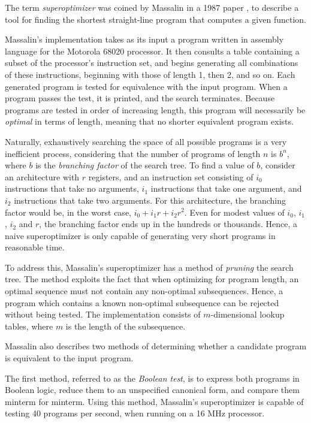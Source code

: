 \documentclass[a4paper,11pt]{kth-mag}
\begin{document}
The term \emph{superoptimizer} was coined by Massalin in a 1987 paper \cite{massalin87}, to describe a tool for finding the shortest straight-line program that computes a given function. %

Massalin's implementation takes as its input a program written in assembly language for the Motorola 68020 processor.
It then consults a table containing a subset of the processor's instruction set, and begins generating all combinations of these instructions, beginning with those of length 1, then 2, and so on.
Each generated program is tested for equivalence with the input program.
When a program passes the test, it is printed, and the search terminates.
Because programs are tested in order of increasing length, this program will necessarily be \emph{optimal} in terms of length, meaning that no shorter equivalent program exists.

Naturally, exhaustively searching the space of all possible programs is a very inefficient process, considering that the number of programs of length $n$ is $b^n$, where $b$ is the \emph{branching factor} of the search tree.
To find a value of $b$, consider an architecture with $r$ registers, and an instruction set consisting of $i_0$ instructions that take no arguments, $i_1$ instructions that take one argument, and $i_2$ instructions that take two arguments.
For this architecture, the branching factor would be, in the worst case, $i_0+i_1r+i_2r^2$.
Even for modest values of $i_0$, $i_1$, $i_2$ and $r$, the branching factor ends up in the hundreds or thousands.
Hence, a naive superoptimizer is only capable of generating very short programs in reasonable time.

To address this, Massalin's superoptimizer has a method of \emph{pruning} the search tree.
The method exploits the fact that when optimizing for program length, an optimal sequence must not contain any non-optimal subsequences.
Hence, a program which contains a known non-optimal subsequence can be rejected without being tested.
The implementation consists of $m$-dimensional lookup tables, where $m$ is the length of the subsequence.

Massalin also describes two methods of determining whether a candidate program is equivalent to the input program.

The first method, referred to as the \emph{Boolean test}, is to express both programs in Boolean logic, reduce them to an unspecified canonical form, and compare them minterm for minterm.
Using this method, Massalin's superoptimizer is capable of testing 40 programs per second, when running on a 16 MHz processor.
\end{document}
